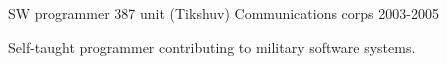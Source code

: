 \begin{cventries}
  \cventry
    {SW programmer}
    {387 unit (Tikshuv)}
    {Communications corps}
    {2003-2005}
    {
      \begin{cvitems}
        \item {Self-taught programmer contributing to military software systems.}
      \end{cvitems}
    }
\end{cventries}